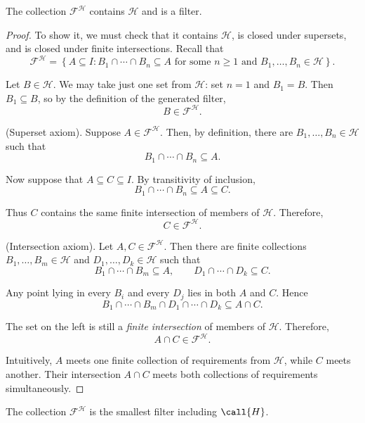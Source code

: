 {\begin{prop}
The collection \(\mathcal{F}^{\mathcal H}\) contains \(\mathcal H\) and is a
filter.
\end{prop}

\begin{proof}
To show it, we must check that it
contains \(\mathcal H\), is closed under supersets, and is closed under finite
intersections. Recall that
\[
\mathcal{F}^{\mathcal H}
=
\left\{
A \subseteq I :
B_1 \cap \cdots \cap B_n \subseteq A
\text{ for some } n \geq 1
\text{ and } B_1,\ldots,B_n \in \mathcal H
\right\}.
\]

Let \(B \in \mathcal H\). We may take just one set from \(\mathcal H\): set
\(n=1\) and \(B_1=B\). Then \(B_1 \subseteq B\), so by the definition of the
generated filter,
\[
B \in \mathcal{F}^{\mathcal H}.
\]

(Superset axiom). Suppose \(A \in \mathcal{F}^{\mathcal H}\). Then, by definition, there are
\(B_1,\ldots,B_n \in \mathcal H\) such that
\[
B_1 \cap \cdots \cap B_n \subseteq A.
\]

Now suppose that \(A \subseteq C \subseteq I\). By transitivity of
inclusion,
\[
B_1 \cap \cdots \cap B_n \subseteq A \subseteq C.
\]

Thus \(C\) contains the same finite intersection of members of
\(\mathcal H\). Therefore,
\[
C \in \mathcal{F}^{\mathcal H}.
\]

(Intersection axiom). Let \(A,C \in \mathcal{F}^{\mathcal H}\). Then there are finite collections
\(B_1,\ldots,B_m \in \mathcal H\) and
\(D_1,\ldots,D_k \in \mathcal H\) such that
\[
B_1 \cap \cdots \cap B_m \subseteq A,
\qquad
D_1 \cap \cdots \cap D_k \subseteq C.
\]

Any point lying in every \(B_i\) and every \(D_j\) lies in both \(A\) and
\(C\). Hence
\[
B_1 \cap \cdots \cap B_m
\cap
D_1 \cap \cdots \cap D_k
\subseteq
A \cap C.
\]

The set on the left is still a \emph{finite intersection} of members of
\(\mathcal H\). Therefore,
\[
A \cap C \in \mathcal{F}^{\mathcal H}.
\]

Intuitively, \(A\) meets one finite collection of requirements from
\(\mathcal H\), while \(C\) meets another. Their intersection \(A \cap C\)
meets both collections of requirements simultaneously.
\end{proof}

\begin{prop}
The collection \(\mathcal{F}^{\mathcal H}\) is the smallest filter including
\(\call{H}\).
\end{prop}

}
